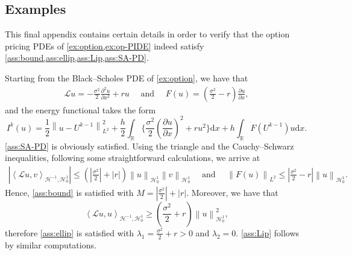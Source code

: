 \documentclass[11pt,a4paper,reqno]{amsart}
\numberwithin{equation}{section}
\theoremstyle{plain}
\theoremstyle{definition}
\def\ud{\mathrm d}
\newcommand{\ip}[1]{\left\langle#1\right\rangle}
\newcommand{\cL}{\mathcal{L}}
\newcommand{\cH}{\mathcal{H}}
\newcommand{\R}{\mathbb{R}}
\newcommand{\norm}[1]{\left\|#1 \right\|} %
\newcommand{\abs}[1]{\left|#1\right|} %
\begin{document}

\subsection{Examples}
\label{appendix:examples}

This final appendix contains certain details in order to verify that the option pricing PDEs of \cref{ex:option,ex:op-PIDE} indeed satisfy \cref{ass:bound,ass:ellip,ass:Lip,ass:SA-PD}.

Starting from the Black--Scholes PDE of \cref{ex:option}, we have that 
\begin{align*}
\mathcal{L}u  = - \frac{\sigma^2}{2} \frac{\partial^2 u}{\partial x^2} + r u 
    \quad \text{ and } \quad
F(u) = \left( \frac{\sigma^2}{2} - r \right) \frac{\partial u}{\partial x},
\end{align*}
and the energy functional takes the form
\[
I^k(u) 
    = \frac{1}{2} \norm{u - U^{k-1}}^2_{L^2} + \frac{h}{2} \int_{\R} \Big\{ \frac{\sigma^2}{2} \left( \frac{\partial u}{\partial x} \right)^2 + r u^2 \Big\}\ud x + h \int_{\R} F \left( U^{k-1} \right) u \ud x.
\]
\cref{ass:SA-PD} is obviously satisfied.
Using the triangle and the Cauchy--Schwarz inequalities, following some straightforward calculations, we arrive at
\begin{align*}
\abs{\ip{\cL  u,  v}_{\cH^{-1},\cH_0^1}} 
     \leq \left(\abs{\frac{\sigma^2}{2}} + \abs{r} \right) \norm{u}_{\cH_0^1} \norm{v}_{\cH_0^1} 
    \quad \text{ and } \quad
\norm{F(u)}_{L^2} 
     \leq \abs{\frac{\sigma^2}{2} - r} \norm{u}_{\cH_0^1}.
\end{align*}
Hence, \cref{ass:bound} is satisfied with $M = \abs{\frac{\sigma^2}{2}} + \abs{r}$.
Moreover, we have that
\[
\ip{\cL  u,  u}_{\cH^{-1},\cH_0^1} 
    \geq \left( \frac{\sigma^2}{2} + r \right) \norm{u}_{\cH_0^1}^2,
\]
therefore \cref{ass:ellip} is satisfied with $\lambda_1 = \frac{\sigma^2}{2} + r > 0$ and $\lambda_2=0$.
\cref{ass:Lip} follows by similar computations.
\end{document}
